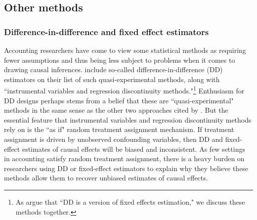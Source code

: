\documentclass[12pt,reqno,titlepage]{amsart}
\begin{document}
\begin{doublespace}


\subsection{Other methods}

\subsubsection{Difference-in-difference and fixed effect estimators}
Accounting researchers have come to view some statistical methods as requiring fewer assumptions and thus being less subject to problems when it comes to drawing causal inferences. 
\citet[p.\,12]{Angrist:2010jv} include so-called difference-in-difference (DD) estimators on their list of such quasi-experimental methods, along with ``instrumental variables and regression discontinuity methods."\footnote{As \citet[p.\,228]{Angrist:2008vk} argue that ``DD is a version of fixed effects estimation," we discuss these methods together.}
Enthusiasm for DD designs perhaps stems from a belief that these are ``quasi-experimental" methods in the same sense as the other two approaches cited by \citet[p.\,12]{Angrist:2010jv}.
But the essential feature that instrumental variables and regression discontinuity methods rely on is the ``as if" random treatment assignment mechanism.
If treatment assignment is driven by unobserved confounding variables, then DD and fixed-effect estimates of causal effects will be biased and inconsistent. 
As few settings in accounting satisfy random treatment assignment, there is a heavy burden on researchers using DD or fixed-effect estimators to explain why they believe these methods allow them to recover unbiased estimates of causal effects.


\end{doublespace}
\end{document}
